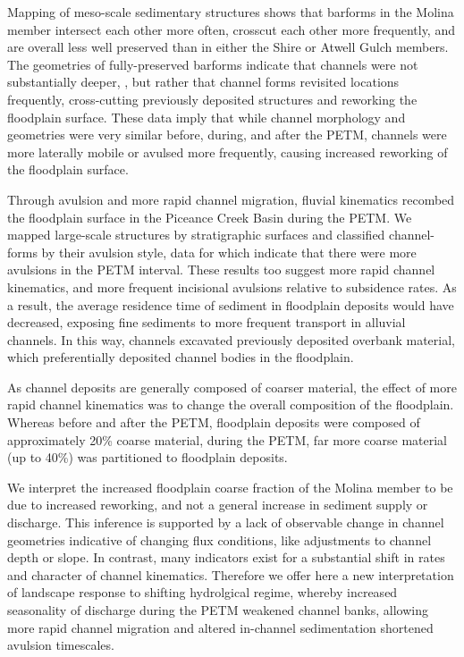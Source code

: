 \documentclass[draft]{compact_proposal}
\begin{document}
Mapping of meso-scale sedimentary structures shows that barforms in the Molina member intersect each other more often, crosscut each other more frequently, and are overall less well preserved than in either the Shire or Atwell Gulch members.
The geometries of fully-preserved barforms indicate that channels were not substantially deeper, , but rather that channel forms revisited locations frequently, cross-cutting previously deposited structures and reworking the floodplain surface.
These data imply that while channel morphology and geometries were very similar before, during, and after the PETM, channels were more laterally mobile or avulsed more frequently, causing increased reworking of the floodplain surface.

Through avulsion and more rapid channel migration, fluvial kinematics recombed the floodplain surface in the Piceance Creek Basin during the PETM.
We mapped large-scale structures by stratigraphic surfaces and classified channel-forms by their avulsion style, data for which indicate that there were more  avulsions in the PETM interval.
These results too suggest more rapid channel kinematics, and more frequent incisional avulsions relative to subsidence rates.
As a result, the average residence time of sediment in floodplain deposits would have decreased, exposing fine sediments to more frequent transport in alluvial channels.
In this way, channels excavated previously deposited overbank material, which preferentially deposited channel bodies in the floodplain.

As channel deposits are generally composed of coarser material, the effect of more rapid channel kinematics was to change the overall composition of the floodplain.
Whereas before and after the PETM, floodplain deposits were composed of approximately 20\% coarse material, during the PETM, far more coarse material (up to 40\%) was partitioned to floodplain deposits.

We interpret the increased floodplain coarse fraction of the Molina member to be due to increased reworking, and not a general increase in sediment supply or discharge.
This inference is supported by a lack of observable change in channel geometries indicative of changing flux conditions, like adjustments to channel depth or slope.
In contrast, many indicators exist for a substantial shift in rates and character of channel kinematics.
Therefore we offer here a new interpretation of landscape response to shifting hydrolgical regime, whereby increased seasonality of discharge during the PETM weakened channel banks, allowing more rapid channel migration and altered in-channel sedimentation shortened avulsion timescales.
\end{document}
